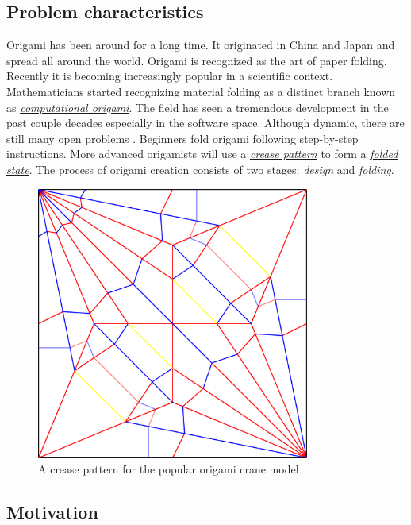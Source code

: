 \subsection{Problem characteristics}
Origami has been around for a long time. It originated in China and Japan and
spread all around the world\cite{wiki:history-of-origami}. Origami is
recognized as the art of paper folding. Recently it is becoming increasingly popular in a scientific context.
Mathematicians started recognizing material folding as a distinct
branch known as \hyperref[dictionary:computational-origami]{\textit{computational origami}}.
The field has seen a tremendous development in the past couple decades especially in the software space.
Although dynamic, there are still many open problems \cite{mit-open-problems}.
Beginners fold origami following step-by-step instructions.
More advanced origamists will use a \hyperref[dictionary:crease-pattern]{\textit{crease pattern}}
to form a \hyperref[dictionary:folded-state]{\textit{folded state}}.
The process of origami creation consists of two stages: \textit{design} and \textit{folding}.

\begin{figure}[H]
\caption{A crease pattern for the popular origami crane model}
  \centering
    \includegraphics[width=0.8\textwidth]{assets/crane-crease-pattern.png}
\end{figure}

\subsection{Motivation}

